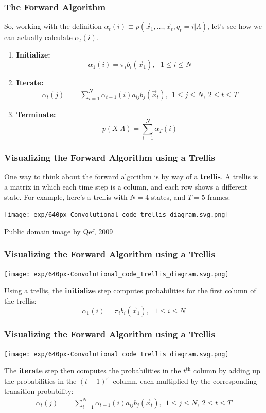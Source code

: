 \documentclass{beamer}
\begin{document}
\begin{frame}
  \frametitle{The Forward Algorithm}

  So, working with the definition $\alpha_t(i) \equiv
  p(\vec{x}_1,\ldots,\vec{x}_t,q_t=i|\Lambda)$, let's see how we can
  actually calculate $\alpha_t(i)$.
  \begin{enumerate}
  \item {\bf Initialize:}
    \[
    \alpha_1(i) = \pi_i b_i(\vec{x}_1),~~~1\le i\le N
    \]
  \item {\bf Iterate:}
    \begin{align*}
      \alpha_{t}(j) &= \sum_{i=1}^N \alpha_{t-1}(i) a_{ij}b_j(\vec{x}_t),~~1\le j\le N,~2\le t\le T
    \end{align*}
  \item {\bf Terminate:}
    \[
    p(X|\Lambda) = \sum_{i=1}^N \alpha_T(i)
    \]
  \end{enumerate}
\end{frame}

\begin{frame}
  \frametitle{Visualizing the Forward Algorithm using a Trellis}

  One way to think about the forward algorithm is by way of a {\bf
    trellis}.  A trellis is a matrix in which each time step is a
  column, and each row shows a different state.  For example, here's a
  trellis with $N=4$ states, and $T=5$ frames:
  
  \centerline{\texttt{[image: exp/640px-Convolutional\_code\_trellis\_diagram.svg.png]}}
  \centerline{\small Public domain image by Qef, 2009}
\end{frame}

\begin{frame}
  \frametitle{Visualizing the Forward Algorithm using a Trellis}

  \centerline{\texttt{[image: exp/640px-Convolutional\_code\_trellis\_diagram.svg.png]}}

  Using a trellis, the {\bf initialize} step computes probabilities
  for the first column of the trellis:
  \[
  \alpha_1(i) = \pi_i b_i(\vec{x}_1),~~~1\le i\le N
  \]  
\end{frame}

\begin{frame}
  \frametitle{Visualizing the Forward Algorithm using a Trellis}

  \centerline{\texttt{[image: exp/640px-Convolutional\_code\_trellis\_diagram.svg.png]}}

  The {\bf iterate} step then computes the probabilities in the
  $t^{\textrm{th}}$ column by adding up the probabilities in the
  $(t-1)^{\textrm{st}}$ column, each multiplied by the corresponding
  transition probability:
  \begin{align*}
    \alpha_{t}(j) &= \sum_{i=1}^N \alpha_{t-1}(i) a_{ij}b_j(\vec{x}_t),~~1\le j\le N,~2\le t\le T
  \end{align*}
\end{frame}
\end{document}
